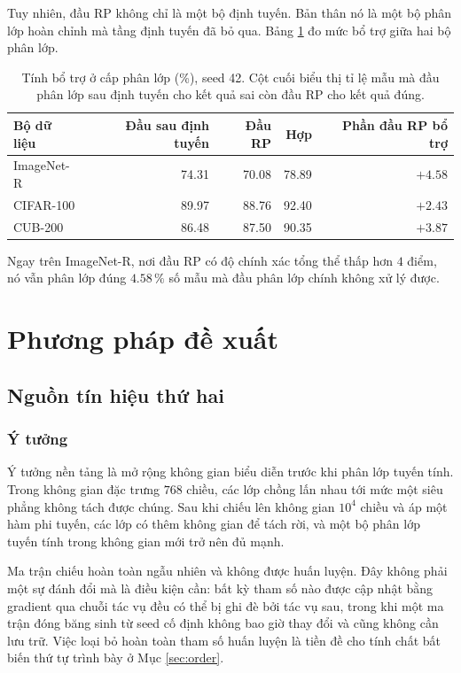 \documentclass[11pt,a4paper]{article}
\begin{document}
Tuy nhiên, đầu RP không chỉ là một bộ định tuyến. Bản thân nó là một bộ phân lớp
hoàn chỉnh mà tầng định tuyến đã bỏ qua. Bảng \ref{tab:cls} đo mức bổ trợ giữa
hai bộ phân lớp.

\begin{table}[htbp]
\centering
\caption{Tính bổ trợ ở cấp phân lớp (\%), seed 42. Cột cuối biểu thị tỉ lệ mẫu
mà đầu phân lớp sau định tuyến cho kết quả sai còn đầu RP cho kết quả đúng.}
\label{tab:cls}
\begin{tabular}{lrrrr}
\toprule
Bộ dữ liệu & Đầu sau định tuyến & Đầu RP & Hợp & Phần đầu RP bổ trợ \\
\midrule
ImageNet-R & 74.31 & 70.08 & 78.89 & $+4.58$ \\
CIFAR-100  & 89.97 & 88.76 & 92.40 & $+2.43$ \\
CUB-200    & 86.48 & 87.50 & 90.35 & $+3.87$ \\
\bottomrule
\end{tabular}
\end{table}

Ngay trên ImageNet-R, nơi đầu RP có độ chính xác tổng thể thấp hơn $4$ điểm, nó
vẫn phân lớp đúng $4.58\,\%$ số mẫu mà đầu phân lớp chính không xử lý được.

\section{Phương pháp đề xuất}

\subsection{Nguồn tín hiệu thứ hai}

\subsubsection{Ý tưởng}

Ý tưởng nền tảng là mở rộng không gian biểu diễn trước khi phân lớp tuyến tính.
Trong không gian đặc trưng $768$ chiều, các lớp chồng lấn nhau tới mức một siêu
phẳng không tách được chúng. Sau khi chiếu lên không gian $10^4$ chiều và áp một
hàm phi tuyến, các lớp có thêm không gian để tách rời, và một bộ phân lớp tuyến
tính trong không gian mới trở nên đủ mạnh.

Ma trận chiếu hoàn toàn ngẫu nhiên và không được huấn luyện. Đây không phải một
sự đánh đổi mà là điều kiện cần: bất kỳ tham số nào được cập nhật bằng gradient
qua chuỗi tác vụ đều có thể bị ghi đè bởi tác vụ sau, trong khi một ma trận đóng
băng sinh từ seed cố định không bao giờ thay đổi và cũng không cần lưu trữ. Việc
loại bỏ hoàn toàn tham số huấn luyện là tiền đề cho tính chất bất biến thứ tự
trình bày ở Mục \ref{sec:order}.
\end{document}
